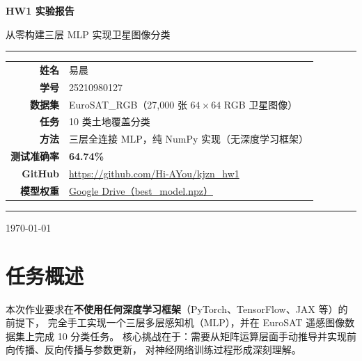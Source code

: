 \documentclass[12pt, a4paper]{article}
\begin{document}

\begin{titlepage}
  \centering
  \vspace*{2cm}
  {\Huge\bfseries\color{blue!70!black} HW1 实验报告\par}
  \vspace{0.5em}
  {\LARGE 从零构建三层 MLP 实现卫星图像分类\par}
  \vspace{2em}
  \rule{0.8\linewidth}{1.5pt}
  \vspace{1.5em}

  \begin{tabular}{rl}
    \textbf{姓名}     & 易晨 \\[4pt]
    \textbf{学号}     & 25210980127 \\[4pt]
    \textbf{数据集}   & EuroSAT\_RGB（27,000 张 $64\times64$ RGB 卫星图像） \\[4pt]
    \textbf{任务}     & 10 类土地覆盖分类 \\[4pt]
    \textbf{方法}     & 三层全连接 MLP，纯 NumPy 实现（无深度学习框架） \\[4pt]
    \textbf{测试准确率} & \textbf{64.74\%} \\[4pt]
    \textbf{GitHub}  & \href{https://github.com/Hi-AYou/kjzn_hw1}{https://github.com/Hi-AYou/kjzn\_hw1} \\[4pt]
    \textbf{模型权重} & \href{https://drive.google.com/drive/folders/1OHgKIYI8lV6QxD7adL9WdBczMfKI1RDX?usp=sharing}{Google Drive（best\_model.npz）} \\
  \end{tabular}

  \vspace{2em}
  \rule{0.8\linewidth}{1.5pt}
  \vfill
  {\large\today}
\end{titlepage}

\tableofcontents
\newpage

\section{任务概述}

本次作业要求在\textbf{不使用任何深度学习框架}（PyTorch、TensorFlow、JAX 等）的前提下，
完全手工实现一个三层多层感知机（MLP），并在 EuroSAT 遥感图像数据集上完成 10 分类任务。
核心挑战在于：需要从矩阵运算层面手动推导并实现前向传播、反向传播与参数更新，
对神经网络训练过程形成深刻理解。
\end{document}
